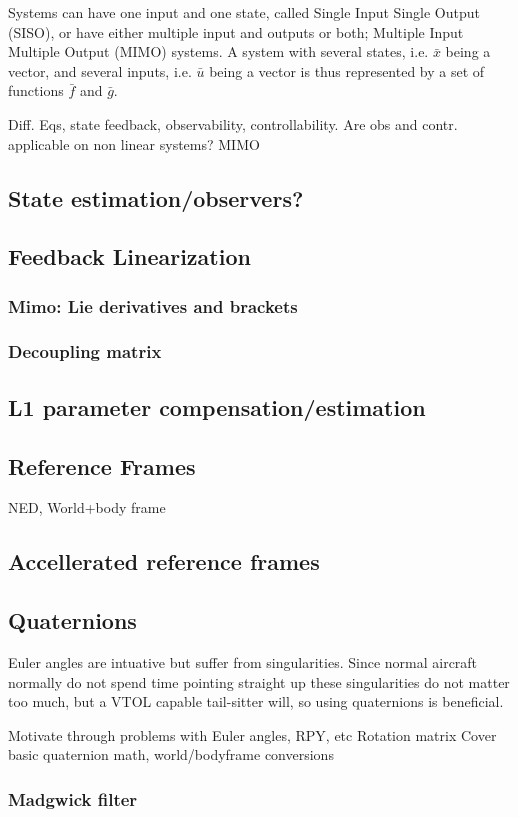 \documentclass{article}
\begin{document}
Systems can have one input and one state, called Single Input Single Output (SISO), or have either multiple input and outputs or both; Multiple Input Multiple Output (MIMO) systems.
A system with several states, i.e. $\bar{x}$ being a vector, and several inputs, i.e. $\bar{u}$ being a vector is thus represented by a set of functions $\bar{f}$ and $\bar{g}$.

Diff. Eqs, state feedback, observability, controllability.
Are obs and contr. applicable on non linear systems?
MIMO
\subsection{State estimation/observers?}
\subsection{Feedback Linearization}
\subsubsection{Mimo: Lie derivatives and brackets}
\subsubsection{Decoupling matrix}
\subsection{L1 parameter compensation/estimation}
\subsection{Reference Frames}
NED, World+body frame
\subsection{Accellerated reference frames}
\subsection{Quaternions}
Euler angles are intuative but suffer from singularities.
Since normal aircraft normally do not spend time pointing straight up these singularities do not matter too much, but a VTOL capable tail-sitter will, so using quaternions is beneficial.


Motivate through problems with Euler angles, RPY, etc
Rotation matrix
Cover basic quaternion math,
world/bodyframe conversions
\subsubsection{Madgwick filter}
\end{document}
